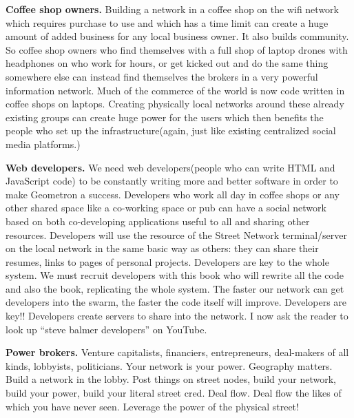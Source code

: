 \textbf{Coffee shop owners.}  Building a network in a coffee shop on the wifi network which requires purchase to use and which has a time limit can create a huge amount of added business for any local business owner.  It also builds community. So coffee shop owners who find themselves with a full shop of laptop drones with headphones on who work for hours, or get kicked out and do the same thing somewhere else can instead find themselves the brokers in a very powerful information network.  Much of the commerce of the world is now code written in coffee shops on laptops.  Creating physically local networks around these already existing groups can create huge power for the users which then benefits the people who set up the infrastructure(again, just like existing centralized social media platforms.)

\textbf{Web developers.}  We need web developers(people who can write HTML and JavaScript code) to be constantly writing more and better software in order to make Geometron a success. Developers who work all day in coffee shops or any other shared space like a co-working space or pub can have a social network based on both co-developing applications useful to all and sharing other resources.  Developers will use the resource of the Street Network terminal/server on the local network in the same basic way as others: they can share their resumes, links to pages of personal projects.  Developers are key to the whole system. We must recruit developers with this book who will rewrite all the code and also the book, replicating the whole system.  The faster our network can get developers into the swarm, the faster the code itself will improve.  Developers are key!!  Developers create servers to share into the network.  I now ask the reader to look up ``steve balmer developers'' on YouTube.

\textbf{Power brokers.} Venture capitalists, financiers, entrepreneurs, deal-makers of all kinds, lobbyists, politicians.  Your network is your power.  Geography matters.  Build a network in the lobby.  Post things on street nodes, build your network, build your power, build your literal street cred. Deal flow. Deal flow the likes of which you have never seen.  Leverage the power of the physical street! 

